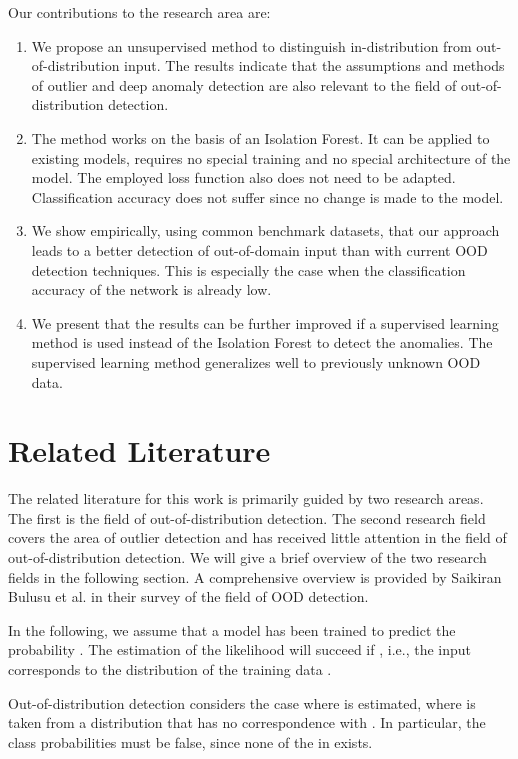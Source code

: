 \documentclass{article}
\begin{document}
Our contributions to the research area are:
\begin{enumerate}
    \item We propose an unsupervised method to distinguish in-distribution from out-of-distribution input. The results indicate that the assumptions and methods of outlier and deep anomaly detection are also relevant to the field of out-of-distribution detection.
    \item The method works on the basis of an Isolation Forest. It can be applied to existing models, requires no special training and no special architecture of the model. The employed loss function also does not need to be adapted. Classification accuracy does not suffer since no change is made to the model.
    \item We show empirically, using common benchmark datasets, that our approach leads to a better detection of out-of-domain input than with current OOD detection techniques. This is especially the case when the classification accuracy of the network is already low.
    \item We present that the results can be further improved if a supervised learning method is used instead of the Isolation Forest to detect the anomalies. The supervised learning method generalizes well to previously unknown OOD data.
\end{enumerate}


\section{Related Literature}

The related literature for this work is primarily guided by two research areas. The first is the field of out-of-distribution detection. The second research field covers the area of outlier detection and has received little attention in the field of out-of-distribution detection. We will give a brief overview of the two research fields in the following section. A comprehensive overview is provided by  Saikiran Bulusu et al. \cite{SaikiranBulusu.2020} in their survey of the field of OOD detection.

In the following, we assume that a model  has been trained to predict the probability . The estimation of the likelihood will succeed if , i.e., the input  corresponds to the distribution of the training data .

Out-of-distribution detection considers the case where  is estimated, where  is taken from a distribution that has no correspondence with . In particular, the class probabilities  must be false, since none of the  in  exists. 
\end{document}
